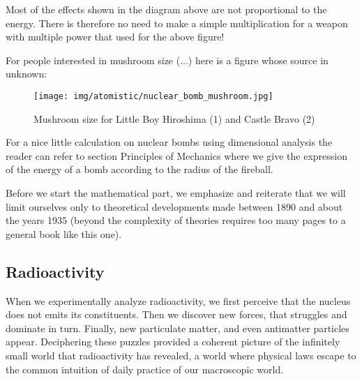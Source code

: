 	Most of the effects shown in the diagram above are not proportional to the energy. There is therefore no need to make a simple multiplication for a weapon with multiple power that used for the above figure!
	
	For people interested in mushroom size (...) here is a figure whose source in unknown:
	\begin{figure}[H]
		\begin{center}
		\texttt{[image: img/atomistic/nuclear\_bomb\_mushroom.jpg]}
		\end{center}	
		\caption{Mushroom size for Little Boy Hiroshima (1) and Castle Bravo (2)}
	\end{figure}
	\begin{tcolorbox}[title=Remark,colframe=black,arc=10pt]
	For a nice little calculation on nuclear bombs using dimensional analysis the reader can refer to section Principles of Mechanics where we give the expression of the energy of a bomb according to the radius of the fireball.
	\end{tcolorbox}
	
	Before we start the mathematical part, we emphasize and reiterate that we will limit ourselves only to theoretical developments made between 1890 and about the years 1935 (beyond the complexity of theories requires too many pages to a general book like this one).
	
	\pagebreak
	\subsection{Radioactivity}
	When we experimentally analyze radioactivity, we first perceive that the nucleus does not emits its constituents. Then we discover new forces, that struggles and dominate in turn. Finally, new particulate matter, and even antimatter particles appear. Deciphering these puzzles provided a coherent picture of the infinitely small world that radioactivity has revealed, a world where physical laws escape to the common intuition of daily practice of our macroscopic world.
	
